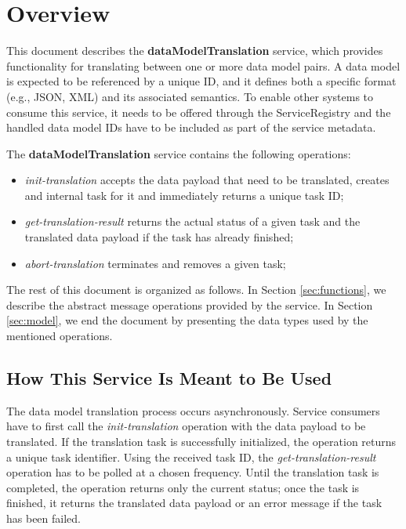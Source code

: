 \documentclass[a4paper]{arrowhead}
\begin{document}
\section{Overview}
\label{sec:overview}
This document describes the \textbf{dataModelTranslation} service, which provides functionality for translating between one or more data model pairs. A data model is expected to be referenced by a unique ID, and it defines both a specific format (e.g., JSON, XML) and its associated semantics. To enable other systems to consume this service, it needs to be offered through the ServiceRegistry and the handled data model IDs have to be included as part of the service metadata.

The \textbf{dataModelTranslation} service contains the following operations:

\begin{itemize}
    \item \textit{init-translation} accepts the data payload that need to be translated, creates and internal task for it and immediately returns a unique task ID;
    \item \textit{get-translation-result} returns the actual status of a given task and the translated data payload if the task has already finished;
    \item \textit{abort-translation} terminates and removes a given task;
\end{itemize}

The rest of this document is organized as follows.
In Section \ref{sec:functions}, we describe the abstract message operations provided by the service.
In Section \ref{sec:model}, we end the document by presenting the data types used by the mentioned operations.

\subsection{How This Service Is Meant to Be Used}

The data model translation process occurs asynchronously. Service consumers have to first call the \textit{init-translation} operation with the data payload to be translated. If the translation task is successfully initialized, the operation returns a unique task identifier. Using the received task ID, the \textit{get-translation-result} operation has to be polled at a chosen frequency. Until the translation task is completed, the operation returns only the current status; once the task is finished, it returns the translated data payload or an error message if the task has been failed.
\end{document}
